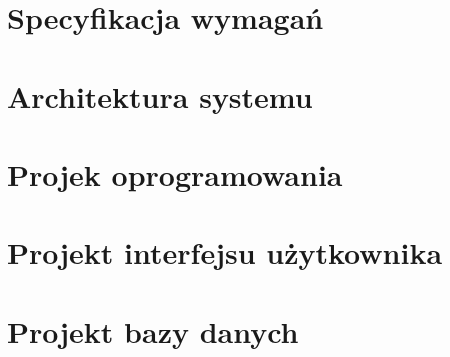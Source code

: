 \documentclass{sprawozdanie-agh}
\begin{document}
	\section{Specyfikacja wymagań}

	\section{Architektura systemu}

	\section{Projek oprogramowania}

	\section{Projekt interfejsu użytkownika}

	\section{Projekt bazy danych}
\end{document}
